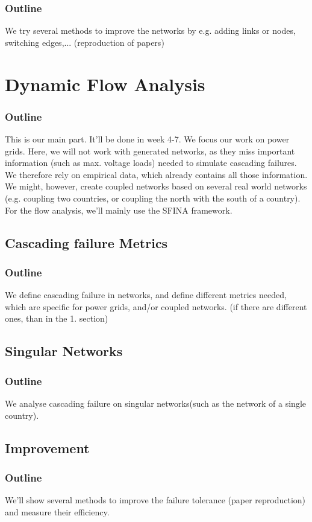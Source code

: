 \documentclass[11pt]{article}
\begin{document}
\subsubsection{Outline}
We try several methods to improve the networks by e.g. adding links or nodes, switching edges,... (reproduction of papers)
\section{Dynamic Flow Analysis} %
\subsubsection{Outline}
This is our main part. It'll be done in week 4-7. We focus our work on power grids. Here, we will not work with generated networks, as they miss important information (such as max. voltage loads) needed to simulate cascading failures. We therefore rely on empirical data, which already contains all those information. We might, however, create coupled networks based on several real world networks (e.g. coupling two countries, or coupling the north with the south of a country).
For the flow analysis, we'll mainly use the SFINA framework. 
\subsection{Cascading failure Metrics}
\subsubsection{Outline}
We define cascading failure in networks, and define different metrics needed, which are specific for power grids, and/or coupled networks. (if there are different ones, than in the 1. section)
\subsection{Singular Networks}
\subsubsection{Outline}
We analyse cascading failure on singular networks(such as the network of a single country).
\subsection{Improvement}
\subsubsection{Outline}
We'll show several methods to improve the failure tolerance (paper reproduction) and measure their efficiency.
\end{document}
